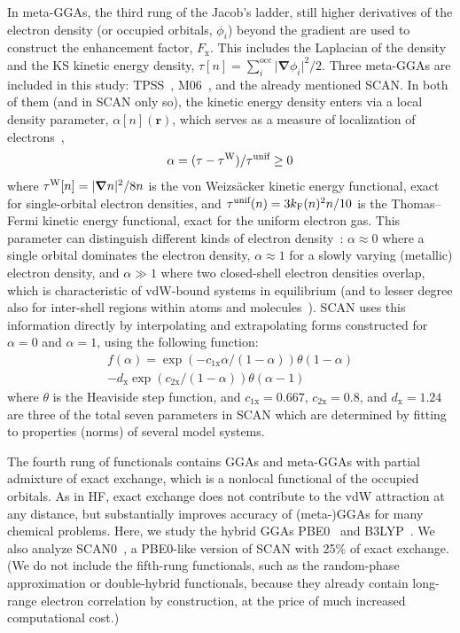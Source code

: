 In meta-GGAs, the third rung of the Jacob's ladder, still higher derivatives of the electron density (or occupied orbitals, $\phi_i$) beyond the gradient are used to construct the enhancement factor, $F_\mathrm x$.
This includes the Laplacian of the density and the KS kinetic energy density, $\tau[n]=\sum_i^\text{occ}\lvert\boldsymbol\nabla\phi_i\rvert^2/2$.
Three meta-GGAs are included in this study: TPSS~\cite{TaoPRL03}, M06~\cite{ZhaoTCA08}, and the already mentioned SCAN\@.
In both of them (and in SCAN only so), the kinetic energy density enters via a local density parameter, $\alpha[n](\mathbf r)$, which serves as a measure of localization of electrons~\cite{BeckeJCP90},
\begin{equation}
  \alpha=(\tau-\tau^\text W)/\tau^\text{unif}\geq0
\end{equation}
where $\tau^\text W[n]=\lvert\boldsymbol\nabla n\rvert^2/8n$ is the von Weizsäcker kinetic energy functional, exact for single-orbital electron densities, and $\tau^\text{unif}(n)=3k_\text F(n)^2n/10$ is the Thomas--Fermi kinetic energy functional, exact for the uniform electron gas.
This parameter can distinguish different kinds of electron density~\cite{SunPRL13}: $\alpha\approx0$ where a single orbital dominates the electron density, $\alpha\approx1$ for a slowly varying (metallic) electron density, and $\alpha\gg1$ where two closed-shell electron densities overlap, which is characteristic of vdW-bound systems in equilibrium (and to lesser degree also for inter-shell regions within atoms and molecules~\cite{BeckeJCP90}).
SCAN uses this information directly by interpolating and extrapolating forms constructed for $\alpha=0$ and $\alpha=1$, using the following function:
\begin{multline}
  f(\alpha)=\exp(-c_\mathrm{1x}\alpha/(1-\alpha))\theta(1-\alpha)\\
  -d_\mathrm x\exp(c_\mathrm{2x}/(1-\alpha))\theta(\alpha-1)
  \label{eq:scan-interp}
\end{multline}
where $\theta$ is the Heaviside step function, and $c_\mathrm{1x}=0.667$, $c_\mathrm{2x}=0.8$, and $d_\mathrm x=1.24$ are three of the total seven parameters in SCAN which are determined by fitting to properties (norms) of several model systems.

The fourth rung of functionals contains GGAs and meta-GGAs with partial admixture of exact exchange, which is a nonlocal functional of the occupied orbitals.
As in HF, exact exchange does not contribute to the vdW attraction at any distance, but substantially improves accuracy of (meta-)GGAs for many chemical problems. %
Here, we study the hybrid GGAs PBE0~\cite{PerdewJCP96,AdamoJCP99} and B3LYP~\cite{BeckeJCP93}.
We also analyze SCAN0~\cite{HuiJCP16}, a PBE0-like version of SCAN with 25\% of exact exchange.
(We do not include the fifth-rung functionals, such as the random-phase approximation or double-hybrid functionals, because they already contain long-range electron correlation by construction, at the price of much increased computational cost.)

